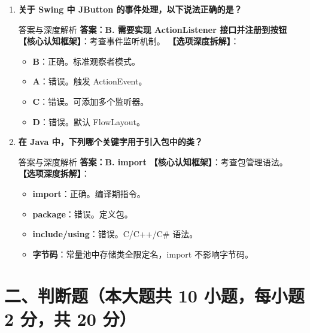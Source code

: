 \documentclass[12pt, a4paper]{ctexart}
\begin{document}
\begin{enumerate}[label=\arabic*.]
	\item \textbf{关于 Swing 中 JButton 的事件处理，以下说法正确的是？}
	      \begin{bluebox}{答案与深度解析}
		      \textbf{答案：B. 需要实现 ActionListener 接口并注册到按钮}
		      \textbf{【核心认知框架】}：考查事件监听机制。
		      \textbf{【选项深度拆解】}：
		      \begin{itemize}[leftmargin=*, nosep]
			      \item \textbf{B}：正确。标准观察者模式。
			      \item \textbf{A}：错误。触发 ActionEvent。
			      \item \textbf{C}：错误。可添加多个监听器。
			      \item \textbf{D}：错误。默认 FlowLayout。
		      \end{itemize}
	      \end{bluebox}

	\item \textbf{在 Java 中，下列哪个关键字用于引入包中的类？}
	      \begin{bluebox}{答案与深度解析}
		      \textbf{答案：B. import}
		      \textbf{【核心认知框架】}：考查包管理语法。
		      \textbf{【选项深度拆解】}：
		      \begin{itemize}[leftmargin=*, nosep]
			      \item \textbf{import}：正确。编译期指令。
			      \item \textbf{package}：错误。定义包。
			      \item \textbf{include/using}：错误。C/C++/C\# 语法。
			      \item \textbf{字节码}：常量池中存储类全限定名，import 不影响字节码。
		      \end{itemize}
	      \end{bluebox}
\end{enumerate}

\section*{二、判断题（本大题共 10 小题，每小题 2 分，共 20 分）}
\end{document}
